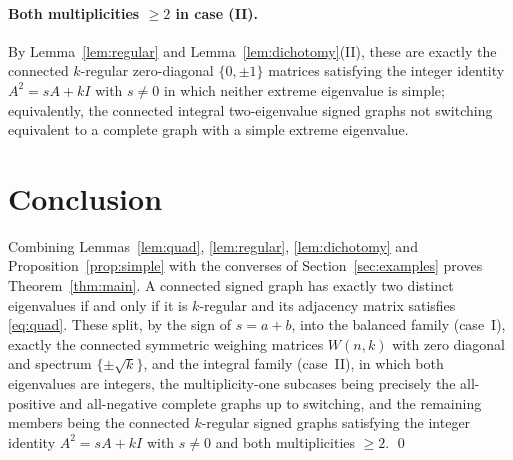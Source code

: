 \documentclass{amsart}
\theoremstyle{definition}
\begin{document}
\paragraph{Both multiplicities $\ge2$ in case (II).}
By Lemma~\ref{lem:regular} and Lemma~\ref{lem:dichotomy}(II), these are exactly
the connected $k$-regular zero-diagonal $\{0,\pm1\}$ matrices satisfying the
integer identity $A^2=sA+kI$ with $s\ne0$ in which neither extreme eigenvalue
is simple; equivalently, the connected integral two-eigenvalue signed graphs
not switching equivalent to a complete graph with a simple extreme eigenvalue.

\section{Conclusion}\label{sec:conclusion}

Combining Lemmas~\ref{lem:quad}, \ref{lem:regular}, \ref{lem:dichotomy} and
Proposition~\ref{prop:simple} with the converses of
Section~\ref{sec:examples} proves Theorem~\ref{thm:main}. A connected signed
graph has exactly two distinct eigenvalues if and only if it is $k$-regular and
its adjacency matrix satisfies \eqref{eq:quad}. These split, by the sign of
$s=a+b$, into the balanced family (case~I), exactly the connected symmetric
weighing matrices $W(n,k)$ with zero diagonal and spectrum $\{\pm\sqrt k\}$,
and the integral family (case~II), in which both eigenvalues are integers,
the multiplicity-one subcases being precisely the all-positive and
all-negative complete graphs up to switching, and the remaining members being
the connected $k$-regular signed graphs satisfying the integer identity
$A^2=sA+kI$ with $s\ne0$ and both multiplicities $\ge2$.
\qed
\end{document}

